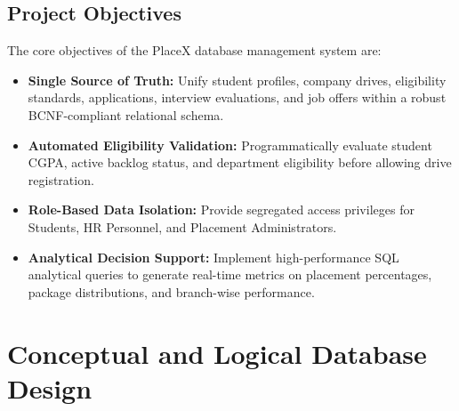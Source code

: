 \documentclass[11pt,a4paper]{article}
\begin{document}
\subsection{Project Objectives}
The core objectives of the PlaceX database management system are:
\begin{itemize}[noitemsep]
    \item \textbf{Single Source of Truth:} Unify student profiles, company drives, eligibility standards, applications, interview evaluations, and job offers within a robust BCNF-compliant relational schema.
    \item \textbf{Automated Eligibility Validation:} Programmatically evaluate student CGPA, active backlog status, and department eligibility before allowing drive registration.
    \item \textbf{Role-Based Data Isolation:} Provide segregated access privileges for Students, HR Personnel, and Placement Administrators.
    \item \textbf{Analytical Decision Support:} Implement high-performance SQL analytical queries to generate real-time metrics on placement percentages, package distributions, and branch-wise performance.
\end{itemize}

\section{Conceptual and Logical Database Design}
\label{sec:design}
\end{document}
